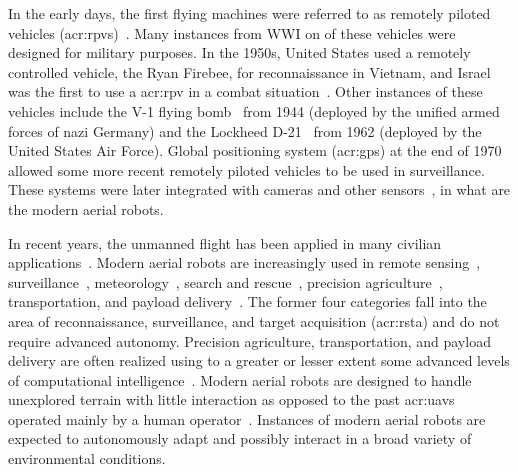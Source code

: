 In the early days, the first flying machines were referred to as remotely piloted vehicles (\Gls{acr:rpv}s)~\citep{anderson2005introduction}. Many instances from WWI on of these vehicles were designed for military purposes. In the 1950s, United States used a remotely controlled vehicle, the Ryan Firebee, for reconnaissance in Vietnam, and Israel was the first to use a \Gls{acr:rpv} in a combat situation~\citep{anderson2005introduction}. Other instances of these vehicles include the V-1 flying bomb~ from 1944 (deployed by the unified armed forces of nazi Germany) and the Lockheed D-21~ from 1962 (deployed by the United States Air Force). Global positioning system (\Gls{acr:gps}) at the end of 1970 allowed some more recent remotely piloted vehicles to be used in surveillance. These systems were later integrated with cameras and other sensors~\citep{siciliano2016springer}, in what are the modern aerial robots.

In recent years, the unmanned flight has been applied in many civilian applications~\citep{gonzalez2017unmanned}. Modern aerial robots are increasingly used in remote sensing~\citep{colomina2014unmanned,noor2018remote,tang2015drone,milas2018drones}, surveillance~\citep{acevedo2014one,ramasamy2017heuristic,basilico2015deploying,paucar2018use,burkle2009collaborating}, meteorology~\citep{renzaglia2016monitoring,schuyler2019using}, search and rescue~\citep{hayat2017multi,pensieri2020drones,karaca2018potential,cui2015drones,seguin2018unmanned}, precision agriculture~\citep{popovic2017online,sa2018weednet,lottes2017uav,daponte2019review,puri2017agriculture}, transportation, and payload delivery~\citep{kellermann2020drones}. The former four categories fall into the area of reconnaissance, surveillance, and target acquisition (\Gls{acr:rsta}) and do not require advanced autonomy. Precision agriculture, transportation, and payload delivery are often realized using to a greater or lesser extent some advanced levels of computational intelligence~\citep{siciliano2016springer}. Modern aerial robots are designed to handle unexplored terrain with little interaction as opposed to the past \Gls{acr:uav}s operated mainly by a human operator~\citep{siciliano2016springer}. Instances of modern aerial robots are expected to autonomously adapt and possibly interact in a broad variety of environmental conditions. 

